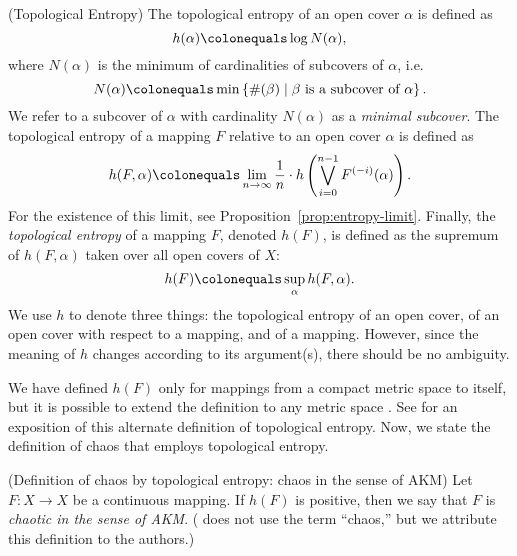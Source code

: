 \documentclass[10pt,twoside,draft]{book}
\begin{document}
\begin{definition}
  (Topological Entropy)
  The topological entropy of an open cover $\alpha$ is defined as
  \begin{equation*}
    h(\alpha) \ceq \log N(\alpha),
  \end{equation*}
  where $N(\alpha)$ is the minimum of cardinalities of subcovers of $\alpha$, i.e.
  \begin{equation*}
    N(\alpha) \ceq \min\setst{ \#(\beta) }{ \beta \mbox{ is a subcover of } \alpha}.
  \end{equation*}
  We refer to a subcover of $\alpha$ with cardinality $N(\alpha)$ as a \textit{minimal subcover}.
  The topological entropy of a mapping $F$ relative to an open cover $\alpha$ is defined as
  \begin{equation*}
    h(F,\alpha) \ceq \lim\limits_{n \to \infty} \frac{1}{n} \cdot h\paren{ \bigvee\limits_{i=0}^{n-1} \itr{F}{(-i)}(\alpha) }.
  \end{equation*}
  For the existence of this limit, see Proposition~\ref{prop:entropy-limit}.
  Finally, the \textit{topological entropy} of a mapping $F$, denoted $h(F)$, is defined as the supremum of $h(F, \alpha)$ taken over all open covers of $X$:
  \begin{equation*}
    h(F) \ceq \sup\limits_\alpha h(F,\alpha).
  \end{equation*}
  We use $h$ to denote three things: the topological entropy of an open cover, of an open cover with respect to a mapping, and of a mapping.
  However, since the meaning of $h$ changes according to its argument(s), there should be no ambiguity.
  \label{defn:t-entropy}
\end{definition}
We have defined $h(F)$ only for mappings from a compact metric space to itself, but it is possible to extend the definition to any metric space \citep{bowen}.
See \citep{walters} for an exposition of this alternate definition of topological entropy.
Now, we state the definition of chaos that employs topological entropy.
\begin{definition}
  (Definition of chaos by topological entropy: chaos in the sense of AKM) 
  Let $F: X \to X$ be a continuous mapping.
  If $h(F)$ is positive, then we say that $F$ is \textit{chaotic in the sense of AKM}.
  (\citet{akm} does not use the term ``chaos,'' but we attribute this definition to the authors.)
\end{definition}
\end{document}
